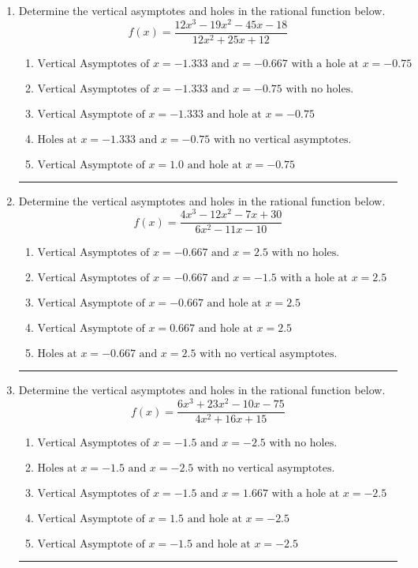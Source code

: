 \documentclass[14pt]{extbook}
\newcommand{\litem}[1]{\item#1\hspace*{-1cm}\rule{\textwidth}{0.4pt}}
\begin{document}
\begin{enumerate}
{\begin{enumerate}[label=\Alph*.]
\end{enumerate} }
\litem{
Determine the vertical asymptotes and holes in the rational function below.\[ f(x) = \frac{12x^{3} -19 x^{2} -45 x -18}{12x^{2} +25 x + 12} \]\begin{enumerate}[label=\Alph*.]
\item \( \text{Vertical Asymptotes of } x = -1.333 \text{ and } x = -0.667 \text{ with a hole at } x = -0.75 \)
\item \( \text{Vertical Asymptotes of } x = -1.333 \text{ and } x = -0.75 \text{ with no holes.} \)
\item \( \text{Vertical Asymptote of } x = -1.333 \text{ and hole at } x = -0.75 \)
\item \( \text{Holes at } x = -1.333 \text{ and } x = -0.75 \text{ with no vertical asymptotes.} \)
\item \( \text{Vertical Asymptote of } x = 1.0 \text{ and hole at } x = -0.75 \)

\end{enumerate} }
\litem{
Determine the vertical asymptotes and holes in the rational function below.\[ f(x) = \frac{4x^{3} -12 x^{2} -7 x + 30}{6x^{2} -11 x -10} \]\begin{enumerate}[label=\Alph*.]
\item \( \text{Vertical Asymptotes of } x = -0.667 \text{ and } x = 2.5 \text{ with no holes.} \)
\item \( \text{Vertical Asymptotes of } x = -0.667 \text{ and } x = -1.5 \text{ with a hole at } x = 2.5 \)
\item \( \text{Vertical Asymptote of } x = -0.667 \text{ and hole at } x = 2.5 \)
\item \( \text{Vertical Asymptote of } x = 0.667 \text{ and hole at } x = 2.5 \)
\item \( \text{Holes at } x = -0.667 \text{ and } x = 2.5 \text{ with no vertical asymptotes.} \)

\end{enumerate} }
\litem{
Determine the vertical asymptotes and holes in the rational function below.\[ f(x) = \frac{6x^{3} +23 x^{2} -10 x -75}{4x^{2} +16 x + 15} \]\begin{enumerate}[label=\Alph*.]
\item \( \text{Vertical Asymptotes of } x = -1.5 \text{ and } x = -2.5 \text{ with no holes.} \)
\item \( \text{Holes at } x = -1.5 \text{ and } x = -2.5 \text{ with no vertical asymptotes.} \)
\item \( \text{Vertical Asymptotes of } x = -1.5 \text{ and } x = 1.667 \text{ with a hole at } x = -2.5 \)
\item \( \text{Vertical Asymptote of } x = 1.5 \text{ and hole at } x = -2.5 \)
\item \( \text{Vertical Asymptote of } x = -1.5 \text{ and hole at } x = -2.5 \)


\end{enumerate}}
\end{enumerate}
\end{document}
